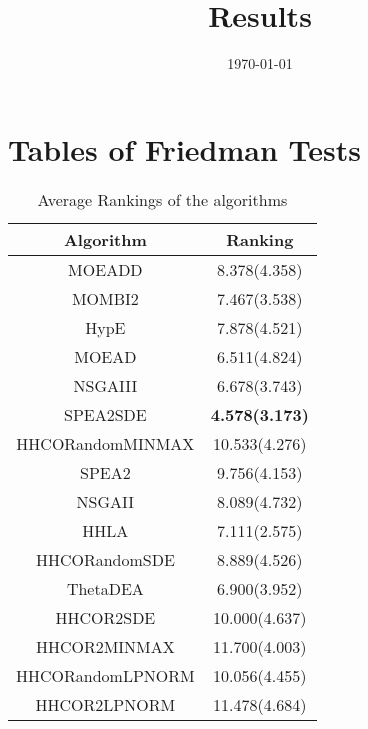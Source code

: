 \documentclass{article}
\title{Results}
\author{}
\date{\today}
\begin{document}
\oddsidemargin 0in \topmargin 0in\maketitle
\section{Tables of Friedman Tests}
\begin{table}[!htp]
\centering
\caption{Average Rankings of the algorithms
}\begin{tabular}{|c|c|}
\hline
Algorithm&Ranking\\
\hline
MOEADD&8.378(4.358)\\\hline
MOMBI2&7.467(3.538)\\\hline
HypE&7.878(4.521)\\\hline
MOEAD&6.511(4.824)\\\hline
NSGAIII&6.678(3.743)\\\hline
SPEA2SDE& {\bf 4.578(3.173)}\\\hline
HHCORandomMINMAX&10.533(4.276)\\\hline
SPEA2&9.756(4.153)\\\hline
NSGAII&8.089(4.732)\\\hline
HHLA&7.111(2.575)\\\hline
HHCORandomSDE&8.889(4.526)\\\hline
ThetaDEA&6.900(3.952)\\\hline
HHCOR2SDE&10.000(4.637)\\\hline
HHCOR2MINMAX&11.700(4.003)\\\hline
HHCORandomLPNORM&10.056(4.455)\\\hline
HHCOR2LPNORM&11.478(4.684)\\\hline
\end{tabular}
\end{table}
\end{document}
